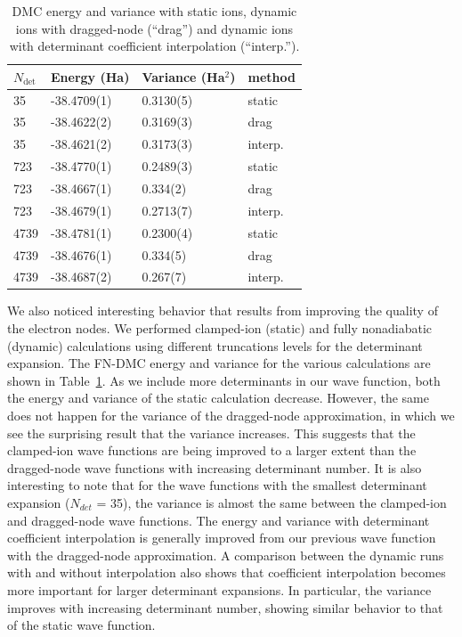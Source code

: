 \begin{table}[h]
\caption{DMC energy and variance with static ions, dynamic ions with dragged-node (``drag'') and dynamic ions with determinant coefficient interpolation (``interp.'').\label{tab:nad-ch-energy}}
\begin{tabular}{llll}
\hline\hline
$N_{\text{det}}$ & Energy (Ha) & Variance (Ha$^2$) & method \\
\hline
35   & -38.4709(1) &  0.3130(5) &    static \\
35   & -38.4622(2) &  0.3169(3) &   drag \\
35   & -38.4621(2) &  0.3173(3) &  interp. \\
723  & -38.4770(1)&  0.2489(3) &    static \\
723  & -38.4667(1) &  0.334(2)~  &   drag \\
723  & -38.4679(1) &  0.2713(7) &  interp. \\
4739 & -38.4781(1) &  0.2300(4) &    static \\
4739 & -38.4676(1) &  0.334(5)~  &   drag \\
4739 & -38.4687(2) &  0.267(7)~  &  interp. \\
\hline\hline
\end{tabular}
\end{table}

We also noticed interesting behavior that results from improving the quality
of the electron nodes. We performed clamped-ion (static) and fully nonadiabatic
(dynamic) calculations using different truncations levels for the determinant
expansion. The FN-DMC energy and variance for the various calculations are
shown in Table~\ref{tab:nad-ch-energy}. As we include more determinants in our wave function,
both the energy and variance of the static calculation decrease. However, the
same does not happen for the variance of the dragged-node approximation, in
which we see the surprising result that the variance increases. This suggests
that the clamped-ion wave functions are being improved to a larger extent than
the dragged-node wave functions with increasing determinant number. It is also
interesting to note that for the wave functions with the smallest determinant
expansion ($N_{det}$ = 35), the variance is almost the same between the clamped-ion
and dragged-node wave functions.
The energy and variance with determinant coefficient interpolation is
generally improved from our previous wave function with the dragged-node
approximation. A comparison between the dynamic runs with and without
interpolation also shows that coefficient interpolation becomes more important
for larger determinant expansions. In particular, the variance improves with
increasing determinant number, showing similar behavior to that of the static
wave function.

